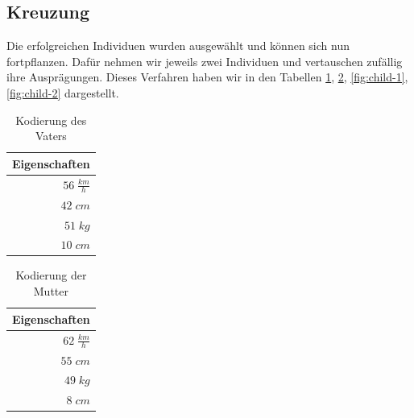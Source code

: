         \subsection{Kreuzung} \label{crossover}
            Die erfolgreichen Individuen wurden ausgewählt und können sich nun fortpflanzen. Dafür nehmen wir jeweils zwei Individuen und vertauschen zufällig ihre Ausprägungen. Dieses Verfahren haben wir in den Tabellen \ref{fig:enc-dad}, \ref{fig:enc-mom}, \ref{fig:child-1}, \ref{fig:child-2} dargestellt.
            \\[4mm]
            \begin{multicols}{2}
                \begin{table}[H]
                    \begin{center}
                    \begin{tabular}{ |r| } 
                        \hline
                        \hfill Eigenschaften  \\ \hline
                        \cellcolor{blue!25} $ 56\; \frac{km}{h}$ \\ \hline
                        \cellcolor{blue!25} $ 42\; cm          $ \\ \hline
                        \cellcolor{blue!25} $ 51\; kg          $ \\ \hline
                        \cellcolor{blue!25} $ 10\; cm          $ \\ \hline
                    \end{tabular}
                    \end{center}
                    \caption{Kodierung des Vaters \label{fig:enc-dad}}
                \end{table}

                \begin{table}[H]
                    \begin{center}
                    \begin{tabular}{ |r| } 
                        \hline
                        \hfill Eigenschaften  \\ \hline
                        \cellcolor{yellow!25} $ 62\; \frac{km}{h}$ \\ \hline
                        \cellcolor{yellow!25} $ 55\; cm          $ \\ \hline
                        \cellcolor{yellow!25} $ 49\; kg          $ \\ \hline
                        \cellcolor{yellow!25} $  8\; cm          $ \\ \hline
                    \end{tabular}
                    \end{center}
                    \caption{Kodierung der Mutter \label{fig:enc-mom}}
                \end{table}

            \end{multicols}

